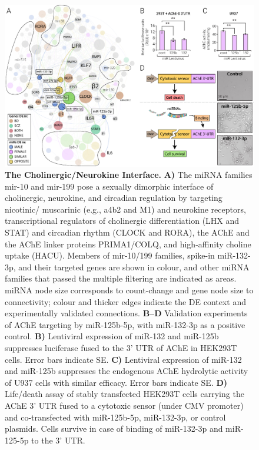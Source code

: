 \begin{figure}[ht]
\includegraphics[width=\textwidth]{figures/smallnet}
\caption[The Cholinergic/Neurokine interface.]{\textbf{The Cholinergic/Neurokine Interface.} \textbf{A)} The miRNA families mir-10 and mir-199 pose a sexually dimorphic interface of cholinergic, neurokine, and circadian regulation by targeting nicotinic/ muscarinic (e.g., a4b2 and M1) and neurokine receptors, transcriptional regulators of cholinergic differentiation (LHX and STAT) and circadian rhythm (CLOCK and RORA), the AChE and the AChE linker proteins PRIMA1/COLQ, and high-affinity choline uptake (HACU). Members of mir-10/199 families, spike-in miR-132-3p, and their targeted genes are shown in colour, and other miRNA families that passed the multiple filtering are indicated as areas. miRNA node size corresponds to count-change and gene node size to connectivity; colour and thicker edges indicate the DE context and experimentally validated connections. \textbf{B–D} Validation experiments of AChE targeting by miR-125b-5p, with miR-132-3p as a positive control. \textbf{B)} Lentiviral expression of miR-132 and miR-125b suppresses luciferase fused to the 3' UTR of AChE in HEK293T cells. Error bars indicate SE. \textbf{C)} Lentiviral expression of miR-132 and miR-125b suppresses the endogenous AChE hydrolytic activity of U937 cells with similar efficacy. Error bars indicate SE. \textbf{D)} Life/death assay of stably transfected HEK293T cells carrying the AChE 3' UTR fused to a cytotoxic sensor (under CMV promoter) and co-transfected with miR-125b-5p, miR-132-3p, or control plasmids. Cells survive in case of binding of miR-132-3p and miR-125-5p to the 3' UTR.
\label{fig:smallnet}}
\end{figure}

